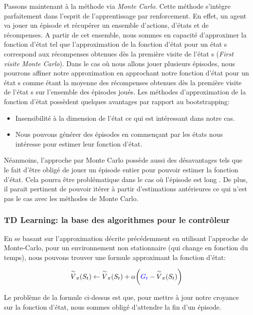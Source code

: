 Passons maintenant à la méthode via \emph{Monte Carlo}. Cette méthode s'intègre parfaitement dans l'esprit de l'apprentissage par renforcement. En effet, un agent va jouer un épisode et récupérer un ensemble d'actions, d'états et de récompenses. A partir de cet ensemble, nous sommes en capacité d'approximer la fonction d'état tel que l'approximation de la fonction d'état pour un état s correspond aux récompenses obtenues dès la première visite de l'état s (\emph{First visite Monte Carlo}\cite{sutton98a}). Dans le cas où nous allons jouer plusieurs épisodes, nous pourrons affiner notre approximation en approchant notre fonction d'état pour un état s comme étant la moyenne des récompenses obtenues dès la première visite de l'état s sur l'ensemble des épisodes joués.
Les méthodes d'approximation de la fonction d'état possèdent quelques avantages par rapport au bootstrapping:

\begin{itemize}
    \item Insensibilité à la dimension de l'état ce qui est intéressant dans notre cas.
    \item Nous pouvons générer des épisodes en commençant par les états nous intéresse pour estimer leur fonction d'état.
\end{itemize}

Néanmoins, l'approche par Monte Carlo possède aussi des désavantages tels que le fait d'être obligé de jouer un épisode entier pour pouvoir estimer la fonction d'état. Cela pourra être problématique dans le cas où l'épisode est  long . De plus, il parait pertinent de pouvoir itérer à partir d'estimations antérieures ce qui n'est pas le cas avec les méthodes de Monte Carlo.

\subsubsection{TD Learning: la base des algorithmes pour le contrôleur}
En se basant sur l'approximation décrite précédemment en utilisant l'approche de Monte-Carlo, pour un environnement non stationnaire (qui change en fonction du temps), nous pouvons trouver une formule approximant la fonction d'état:
 
 \begin{equation}
\overset{\sim}{V}_{\pi}(S_t) \leftarrow \overset{\sim}{V}_{\pi}(S_t) + \alpha \bigg(\textcolor{blue}{G_t} - \overset{\sim}{V}_{\pi}(S_t)\bigg)
\end{equation}
 
Le problème de la formule ci-dessus est que, pour mettre à jour notre croyance sur la fonction d'état, nous sommes obligé d'attendre la fin d'un épisode.

